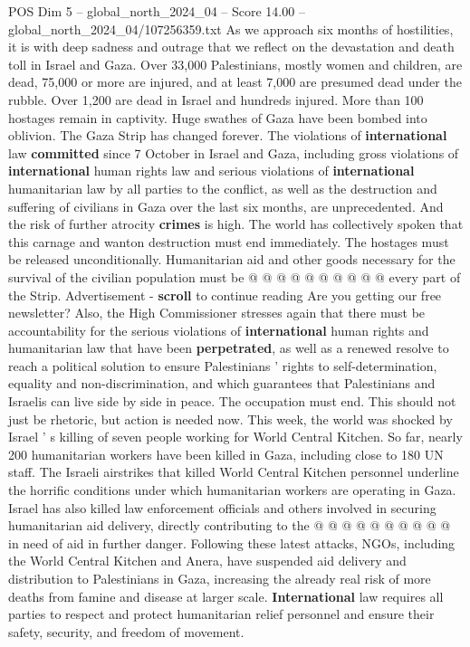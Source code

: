 \begin{textsample}{POS Dim 5 – global\_north\_2024\_04 – Score 14.00 – global\_north\_2024\_04/107256359.txt}  \label{ex:f5_pos_290}
As we approach six months of hostilities, it is with deep sadness and outrage that we reflect on the devastation and death toll in Israel and Gaza.
Over 33,000 Palestinians, mostly women and children, are dead, 75,000 or more are injured, and at least 7,000 are presumed dead under the rubble.
Over 1,200 are dead in Israel and hundreds injured.
More than 100 hostages remain in captivity.
Huge swathes of Gaza have been bombed into oblivion.
The Gaza Strip has changed forever.
The violations of \textbf{international} law \textbf{committed} since 7 October in Israel and Gaza, including gross violations of \textbf{international} human rights law and serious violations of \textbf{international} humanitarian law by all parties to the conflict, as well as the destruction and suffering of civilians in Gaza over the last six months, are unprecedented.
And the risk of further atrocity \textbf{crimes} is high.
The world has collectively spoken that this carnage and wanton destruction must end immediately.
The hostages must be released unconditionally.
Humanitarian aid and other goods necessary for the survival of the civilian population must be @ @ @ @ @ @ @ @ @ @ every part of the Strip.
Advertisement - \textbf{scroll} to continue reading Are you getting our free newsletter?
Also, the High Commissioner stresses again that there must be accountability for the serious violations of \textbf{international} human rights and humanitarian law that have been \textbf{perpetrated}, as well as a renewed resolve to reach a political solution to ensure Palestinians ' rights to self-determination, equality and non-discrimination, and which guarantees that Palestinians and Israelis can live side by side in peace.
The occupation must end.
This should not just be rhetoric, but action is needed now.
This week, the world was shocked by Israel ' s killing of seven people working for World Central Kitchen.
So far, nearly 200 humanitarian workers have been killed in Gaza, including close to 180 UN staff.
The Israeli airstrikes that killed World Central Kitchen personnel underline the horrific conditions under which humanitarian workers are operating in Gaza.
Israel has also killed law enforcement officials and others involved in securing humanitarian aid delivery, directly contributing to the @ @ @ @ @ @ @ @ @ @ in need of aid in further danger.
Following these latest attacks, NGOs, including the World Central Kitchen and Anera, have suspended aid delivery and distribution to Palestinians in Gaza, increasing the already real risk of more deaths from famine and disease at larger scale. \textbf{International} law requires all parties to respect and protect humanitarian relief personnel and ensure their safety, security, and freedom of movement.

\end{textsample}
